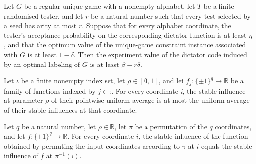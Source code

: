 \begin{theorem}
\label{FABL.RegularUniqueGame.longCodeExperimentValue_optimalDictator_ge}
\leanok
{}
Let $G$ be a regular unique game with a nonempty alphabet, let $T$ be a finite
randomised tester, and let $r$ be a natural number such that every test selected by a
seed has arity at most $r$. Suppose that for every alphabet coordinate, the tester's
acceptance probability on the corresponding dictator function is at least $\eta$, and
that the optimum value of the unique-game constraint instance associated with $G$ is at
least $1-\delta$. Then the experiment value of the dictator code induced by an optimal
labeling of $G$ is at least $\beta-r\delta$.
\end{theorem}

\begin{theorem}
\label{FABL.RegularUniqueGame.stableInfluence_uniformExpectation_le}
\leanok
{}
Let $\iota$ be a finite nonempty index set, let $\rho\in[0,1]$, and let
$f_j:\{\pm1\}^q\to\mathbb R$ be a family of functions indexed by $j\in\iota$. For every
coordinate $i$, the stable influence at parameter $\rho$ of their pointwise uniform
average is at most the uniform average of their stable influences at that coordinate.
\end{theorem}

\begin{theorem}
\label{FABL.RegularUniqueGame.stableInfluence_comp_permuteInput}
\leanok
{}
Let $q$ be a natural number, let $\rho\in\mathbb R$, let $\pi$ be a permutation of the
$q$ coordinates, and let $f:\{\pm1\}^q\to\mathbb R$. For every coordinate $i$, the
stable influence of the function obtained by permuting the input coordinates according
to $\pi$ at $i$ equals the stable influence of $f$ at $\pi^{-1}(i)$.
\end{theorem}

